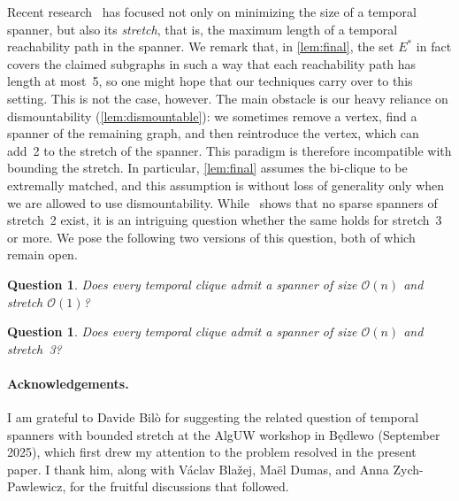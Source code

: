 \documentclass[11pt, letterpaper]{article}
\newcommand{\bigO}{\mathcal{O}}
\theoremstyle{definition}
\theoremstyle{plain}
\newtheorem{question}[definition]{Question}
\begin{document}
Recent research~\cite{BiloESA22} has focused not only on minimizing the size of a temporal spanner, but also its \emph{stretch}, that is, the maximum length of a temporal reachability path in the spanner.
We remark that, in \cref{lem:final}, the set $E^*$ in fact covers the claimed subgraphs in such a way that each reachability path has length at most~5, so one might hope that our techniques carry over to this setting.
This is not the case, however.
The main obstacle is our heavy reliance on dismountability (\cref{lem:dismountable}): we sometimes remove a vertex, find a spanner of the remaining graph, and then reintroduce the vertex, which can add~2 to the stretch of the spanner.
This paradigm is therefore incompatible with bounding the stretch.
In particular, \cref{lem:final} assumes the bi-clique to be extremally matched, and this assumption is without loss of generality only when we are allowed to use dismountability.
While~\cite{BiloESA22} shows that no sparse spanners of stretch~2 exist, it is an intriguing question whether the same holds for stretch~3 or more.
We pose the following two versions of this question, both of which remain open.
\begin{question}
    Does every temporal clique admit a spanner of size $\bigO(n)$ and stretch $\bigO(1)$?
\end{question}
\begin{question}
    Does every temporal clique admit a spanner of size $\bigO(n)$ and stretch~3?
\end{question}

\paragraph{Acknowledgements.}
I am grateful to Davide Bilò for suggesting the related question of temporal spanners with bounded stretch at the AlgUW workshop in Będlewo (September 2025), which first drew my attention to the problem resolved in the present paper. I thank him, along with Václav Blažej, Maël Dumas, and Anna Zych-Pawlewicz, for the fruitful discussions that followed.




\end{document}
